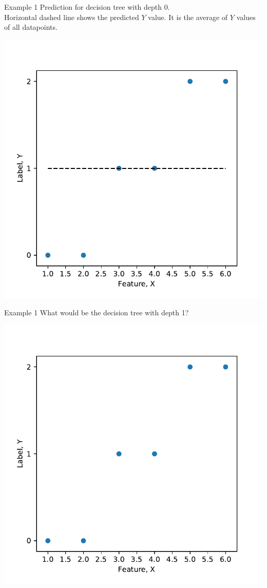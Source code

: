 \documentclass{beamer}
\begin{document}
	\begin{frame}{Example 1}
	Prediction for decision tree with depth 0.\\
	Horizontal dashed line shows the predicted $Y$ value. It is the average of $Y$ values of all datapoints.\\
	\begin{center}
	\includegraphics[scale=0.5]{depth-0-boundary}	
	\end{center}
	\end{frame}


	\begin{frame}{Example 1}
	What would be the decision tree with depth 1?
	\begin{center}
	\includegraphics[scale=0.5]{dataset}
	\end{center}
	\end{frame}
\end{document}
